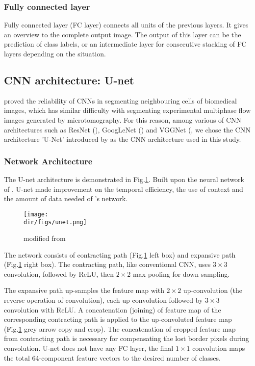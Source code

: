 \subsubsection{Fully connected layer}
Fully connected layer (FC layer) connects all units of the previous layers. It gives an overview to the complete output image. The output of this layer can be the prediction of class labels, or an intermediate layer for consecutive stacking of FC layers depending on the situation.

\subsection{CNN architecture: U-net}
\label{unet_architecture}
\citet{ronneberger2015u} proved the reliability of CNNs in segmenting neighbouring cells of biomedical images, which has similar difficulty with segmenting experimental multiphase flow images generated by microtomography. For this reason, among various of CNN architectures such as ResNet (\citet{he2016deep}), GoogLeNet (\citet{szegedy2015going}) and VGGNet (\citet{simonyan2014very}, we chose the CNN architecture 'U-Net' introduced by \citet{ronneberger2015u} as the CNN architecture used in this study.

\subsubsection{Network Architecture}
The U-net architecture is demonstrated in Fig.\ref{unet}. Built upon the neural network of \citet{ciresan2012deep}, U-net made improvement on the temporal efficiency, the use of context and the amount of data needed of \citet{ciresan2012deep}'s network.

\begin{figure}[htbp]
  \centering
  \texttt{[image: \\dir/figs/unet.png]}
  \caption{modified from \citet{ronneberger2015u}}
  \label{unet}
\end{figure}

The network consists of contracting path (Fig.\ref{unet} left box) and expansive path (Fig.\ref{unet} right box). The contracting path, like conventional CNN, uses $3\times3$ convolution, followed by ReLU, then $2\times2$ max pooling for down-sampling. 

The expansive path up-samples the feature map with $2\times2$ up-convolution (the reverse operation of convolution), each up-convolution followed by $3\times3$ convolution with ReLU. A concatenation (joining) of feature map of the corresponding contracting path is applied to the up-convoluted feature map (Fig.\ref{unet} grey arrow copy and crop). The concatenation of cropped feature map from contracting path is necessary for compensating the lost border pixels during convolution. U-net does not have any FC layer, the final $1\times1$ convolution maps the total 64-component feature vectors to the desired number of classes. 

